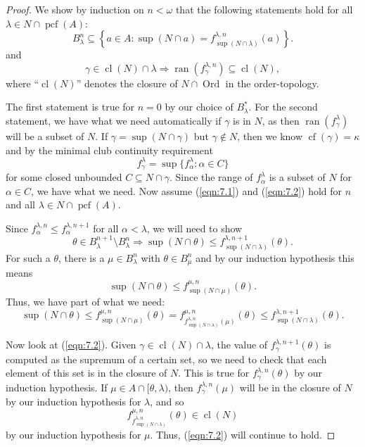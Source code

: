 \documentclass[10pt]{amsart}
\theoremstyle{plain}
\theoremstyle{definition}
\theoremstyle{remark}
\DeclareMathOperator{\cl}{cl}
\DeclareMathOperator{\ran}{ran}
\DeclareMathOperator{\cf}{cf}
\DeclareMathOperator{\pcf}{pcf}
\DeclareMathOperator{\ord}{Ord}
\numberwithin{equation}{section}
\begin{document}
\begin{proof}
We show by induction on $n<\omega$ that the following statements hold for all $\lambda\in N\cap\pcf(A)$:
\begin{equation}
\label{eqn:7.1}
B^{n}_\lambda\subseteq\left\{a\in A: \sup(N\cap a) = f^{\lambda, n}_{\sup(N\cap\lambda)}(a)\right\}.
\end{equation}
and
\begin{equation}
\label{eqn:7.2}
\gamma\in\cl(N)\cap\lambda\Longrightarrow \ran(f^{\lambda, n}_\gamma)\subseteq\cl(N),
\end{equation}
where ``$\cl(N)$'' denotes the closure of $N\cap\ord$ in the order-topology.

The first statement is true for $n = 0$ by our choice of $B^*_\lambda$.  For the second statement, we have what we need automatically
if $\gamma$ is in $N$, as then $\ran(f^\lambda_\gamma)$ will be a subset of $N$.  If $\gamma = \sup(N\cap\gamma)$ but $\gamma\notin N$,
then we know $\cf(\gamma) = \kappa$ and by the minimal club continuity requirement
\begin{equation}
f^\lambda_\gamma = \sup\{f^\lambda_\alpha:\alpha\in C\}
\end{equation}
for some closed unbounded $C\subseteq N\cap\gamma$.  Since the range of $f^\lambda_\alpha$ is a subset of $N$ for $\alpha\in C$,
we have what we need.  Now assume (\ref{eqn:7.1}) and (\ref{eqn:7.2}) hold for $n$ and all $\lambda\in N\cap\pcf(A)$.

Since $f^{\lambda, n}_\alpha\leq f^{\lambda, n+1}_\alpha$ for all $\alpha<\lambda$,
we will need to show
\begin{equation}
\theta\in B^{n+1}_\lambda\setminus B^n_\lambda \Longrightarrow \sup(N\cap\theta)\leq f^{\lambda, n+1}_{\sup(N\cap\lambda)}(\theta).
\end{equation}
For such a $\theta$, there is a $\mu\in B^n_\lambda$ with $\theta\in B^n_\mu$ and by our induction hypothesis this means
\begin{equation}
\sup(N\cap\theta)\leq f^{\mu, n}_{\sup(N\cap\mu)}(\theta).
\end{equation}
Thus, we have part of what we need:
\begin{equation}
\label{eqn:7.3}
\sup(N\cap\theta)\leq f^{\mu, n}_{\sup(N\cap\mu)}(\theta) = f^{\mu, n}_{f^{\lambda, n}_{\sup(N\cap\lambda)}(\mu)}(\theta)\leq f^{\lambda, n+1}_{\sup(N\cap\lambda)}(\theta).
\end{equation}

Now look at (\ref{eqn:7.2}).  Given $\gamma\in\cl(N)\cap\lambda$, the value of $f^{\lambda,n+1}_\gamma(\theta)$ is computed as the supremum
of a certain set, so we need to check that each element of this set is in the closure of $N$.  This is true for $f^{\lambda, n}_\gamma(\theta)$
by our induction hypothesis.  If $\mu\in A\cap [\theta,\lambda)$, then $f^{\lambda, n}_\gamma(\mu)$ will be in the closure of $N$
by our induction hypothesis for $\lambda$, and so
\begin{equation}
f^{\mu, n}_{f^{\lambda, n}_{\sup(N\cap\lambda)}}(\theta)\in\cl(N)
\end{equation}
by our induction hypothesis for $\mu$.  Thus, (\ref{eqn:7.2}) will continue to hold.


\end{proof}
\end{document}
